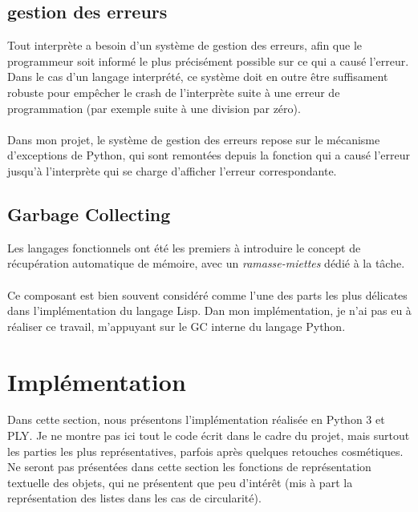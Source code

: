 \documentclass{article}
\begin{document}
\subsection{gestion des erreurs}
Tout interprète a besoin d'un système de gestion des erreurs, afin que le programmeur soit informé le 
plus précisément possible sur ce qui a causé l'erreur. 
Dans le cas d'un langage interprété, ce système doit en outre être suffisament robuste pour empêcher le crash
de l'interprète suite à une erreur de programmation (par exemple suite à une division par zéro).
\paragraph{}
Dans mon projet, le système de gestion des erreurs repose sur le mécanisme d'exceptions de Python, qui sont
remontées depuis la fonction qui a causé l'erreur jusqu'à l'interprète qui se charge d'afficher l'erreur
correspondante.
\subsection{Garbage Collecting}
Les langages fonctionnels ont été les premiers à introduire le concept de récupération automatique de mémoire, 
avec un \emph{ramasse-miettes} dédié à la tâche.
\paragraph{}
Ce composant est bien souvent considéré comme l'une des parts les plus délicates dans l'implémentation du langage
Lisp. Dan mon implémentation, je n'ai pas eu à réaliser ce travail, m'appuyant sur le GC interne du langage Python.



\section{Implémentation}
Dans cette section, nous présentons l'implémentation réalisée en Python 3 et PLY.
Je ne montre pas ici tout le code écrit dans le cadre du projet, mais surtout les parties les plus
représentatives, parfois après quelques retouches cosmétiques.
\\
Ne seront pas présentées dans cette section les fonctions de représentation textuelle des objets,
qui ne présentent que peu d’intérêt (mis à part la représentation des listes dans les cas de circularité).
\end{document}
